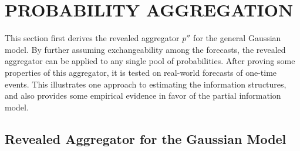 \documentclass[12pt]{article}
\theoremstyle{definition}
\theoremstyle{definition}
\begin{document}
\section{PROBABILITY AGGREGATION}
\label{aggregation}
This section first derives the revealed aggregator $p''$ for the
general Gaussian model. By further assuming
exchangeability among the forecasts, the revealed aggregator can be
applied to any single pool of probabilities. After proving some
properties of this aggregator, it is
tested on real-world forecasts of one-time events. This
illustrates one approach to estimating the information structures, and also provides some empirical evidence in favor of the
partial information model.

\subsection{Revealed Aggregator for the Gaussian Model}
\end{document}
